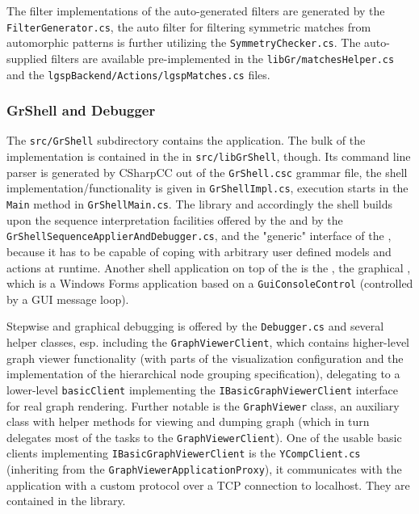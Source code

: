 The filter implementations of the auto-generated filters are generated by the \texttt{Filter\-Generator.cs}, the auto filter for filtering symmetric matches from automorphic patterns is further utilizing the \texttt{Symmetry\-Checker.cs}.
The auto-supplied filters are available pre-implemented in the \texttt{libGr/matches\-Helper.cs} and the \texttt{lgsp\-Backend/Actions/lgsp\-Matches.cs} files.


\subsubsection*{GrShell and Debugger}

The \texttt{src/GrShell} subdirectory contains the \GrShell{} application.
The bulk of the implementation is contained in the \LibGrShell{} in \texttt{src/libGrShell}, though.
Its command line parser is generated by CSharpCC out of the \texttt{GrShell.csc} grammar file, the shell implementation/functionality is given in \texttt{GrShell\-Impl.cs}, execution starts in the \texttt{Main} method in \texttt{GrShell\-Main.cs}.
The library and accordingly the shell builds upon the sequence interpretation facilities offered by the \LibGr{} and by the \texttt{GrShell\-Sequence\-Applier\-And\-Debugger.cs}, and the "generic" interface of the \LibGr{}, because it has to be capable of coping with arbitrary user defined models and actions at runtime.
Another shell application on top of the \LibGrShell{} is the \GGrShell{}, the graphical \GrShell{}, which is a Windows Forms application based on a \texttt{Gui\-Console\-Control} (controlled by a GUI message loop).

Stepwise and graphical debugging is offered by the \texttt{Debugger.cs} and several helper classes, esp. including the \texttt{Graph\-Viewer\-Client}, which contains higher-level graph viewer functionality (with parts of the visualization configuration and the implementation of the hierarchical node grouping specification), delegating to a lower-level \texttt{basic\-Client} implementing the \texttt{IBasic\-Graph\-Viewer\-Client} interface for real graph rendering.
Further notable is the \texttt{Graph\-Viewer} class, an auxiliary class with helper methods for viewing and dumping graph (which in turn delegates most of the tasks to the \texttt{Graph\-Viewer\-Client}).
One of the usable basic clients implementing \texttt{IBasic\-Graph\-Viewer\-Client} is the \texttt{YComp\-Client.cs} (inheriting from the \texttt{Graph\-Viewer\-Application\-Proxy}), it communicates with the \yComp{} application with a custom protocol over a TCP connection to localhost.
They are contained in the \GraphViewerAndSequenceDebugger{} library.

